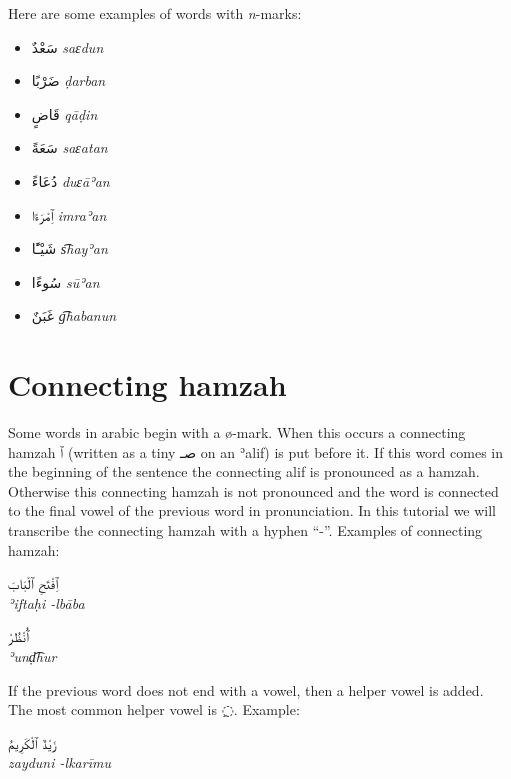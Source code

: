 \documentclass[
  10pt,
]{book}
\providecommand{\tightlist}{%
  \setlength{\itemsep}{0pt}\setlength{\parskip}{0pt}}
\begin{document}
Here are some examples of words with \emph{n}-marks:

\begin{itemize}
\tightlist
\item
  \foreignlanguage{arabic}{سَعْدٌ} \emph{saɛdun} \vphantom{\huge J}
\item
  \foreignlanguage{arabic}{ضَرْبًا} \emph{ḍarban} \vphantom{\huge J}
\item
  \foreignlanguage{arabic}{قَاضٍ} \emph{qāḍin} \vphantom{\huge J}
\item
  \foreignlanguage{arabic}{سَعَةً} \emph{saɛatan} \vphantom{\huge J}
\item
  \foreignlanguage{arabic}{دُعَاءً} \emph{duɛāʾan} \vphantom{\huge J}
\item
  \foreignlanguage{arabic}{ٱِمْرَءًا} \emph{imraʾan} \vphantom{\huge J}
\item
  \foreignlanguage{arabic}{شَيْـًٔا} \emph{s͡hayʾan} \vphantom{\huge J}
\item
  \foreignlanguage{arabic}{سُوءًا} \emph{sūʾan} \vphantom{\huge J}
\item
  \foreignlanguage{arabic}{غَبَنٌ} \emph{g͡habanun} \vphantom{\huge J}
\end{itemize}

\section{Connecting hamzah}\label{connecting-hamzah}

Some words in arabic begin with a ø-mark. When this occurs a connecting hamzah \foreignlanguage{arabic}{ٱ} (written as a tiny \foreignlanguage{arabic}{صـ} on an ʾalif) is put before it. If this word comes in the beginning of the sentence the connecting alif is pronounced as a hamzah. Otherwise this connecting hamzah is not pronounced and the word is connected to the final vowel of the previous word in pronunciation. In this tutorial we will transcribe the connecting hamzah with a hyphen \enquote{-}. Examples of connecting hamzah:

\foreignlanguage{arabic}{ٱِفْتَحِ ٱلْبَابَ}\\
\emph{ʾiftaḥi -lbāba}

\foreignlanguage{arabic}{ٱُنْظُرْ}\\
\emph{ʾunḍ͡hur}

If the previous word does not end with a vowel, then a helper vowel is added. The most common helper vowel is \foreignlanguage{arabic}{◌ِ}. Example:

\foreignlanguage{arabic}{زَيْدٌ ٱلْکَرِيمُ}\\
\emph{zayduni -lkarīmu}
\end{document}
